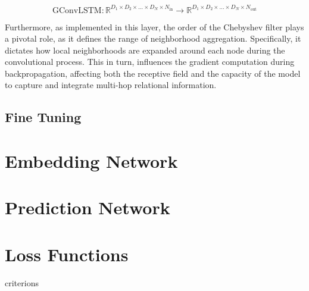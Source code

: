 \begin{equation}
    \text{GConvLSTM}: \mathbb{R}^{D_1 \times D_2 \times \ldots \times D_N \times N_{\text{in}}} \rightarrow \mathbb{R}^{D_1 \times D_2 \times \ldots \times D_N \times N_{\text{out}}}
\end{equation}

Furthermore, as implemented in this layer, the order of the Chebyshev filter plays a pivotal role, as it defines the range of neighborhood aggregation. Specifically, it dictates how local neighborhoods are expanded around each node during the convolutional process. This in turn, influences the gradient computation during backpropagation, affecting both the receptive field and the capacity of the model to capture and integrate multi-hop relational information.




\subsection{Fine Tuning}

\section{Embedding Network} \label{sec:emb}

\section{Prediction Network} \label{sec:pred}


\section{Loss Functions} \label{sec:loss_func}

criterions
